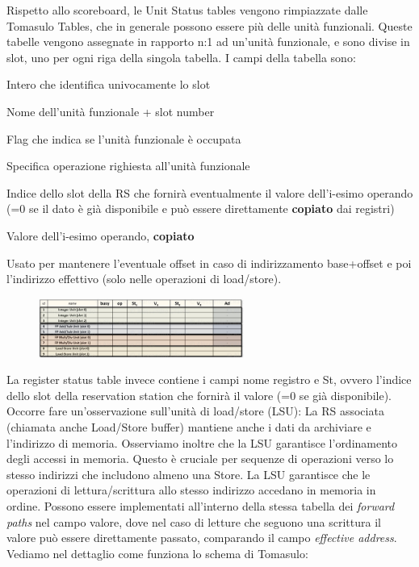 Rispetto allo scoreboard, le Unit Status tables vengono rimpiazzate dalle Tomasulo Tables, che in generale possono essere più delle unità funzionali. Queste tabelle vengono assegnate in rapporto n:1 ad un'unità funzionale, e sono divise in slot, uno per ogni riga della singola tabella. I campi della tabella sono:

\begin{description}[style=nextline,leftmargin=3.45cm,labelwidth=2.8cm,labelsep=0.4cm,font=\ttfamily\bfseries, itemsep=0.01em]
\item[id] Intero che identifica univocamente lo slot
\item[name] Nome dell'unità funzionale + slot number
\item[busy] Flag che indica se l'unità funzionale è occupata
\item[op] Specifica operazione righiesta all'unità funzionale 
\item[$st_1$] Indice dello slot della RS che fornirà eventualmente il valore dell'i-esimo operando (=0 se il dato è già disponibile e può essere direttamente \textbf{copiato} dai registri) 
\item[$V_i$] Valore dell'i-esimo operando, \textbf{copiato} 
\item[$Ad$] Usato per mantenere l'eventuale offset in caso di indirizzamento base+offset e poi l'indirizzo effettivo (solo nelle operazioni di load/store).  
\end{description}


\begin{figure}[ht]
    \centering
    \includegraphics[width=0.6\textwidth]{fig/chapter_2/tomasulo_tables.png}
\end{figure}

\noindent La register status table invece contiene i campi nome registro e St, ovvero l'indice dello slot della reservation station che fornirà il valore (=0 se già disponibile). 
Occorre fare un'osservazione sull'unità di load/store (LSU): La RS associata (chiamata anche Load/Store buffer) mantiene anche i dati da archiviare e l'indirizzo di memoria. Osserviamo inoltre che la LSU garantisce l'ordinamento degli accessi in memoria. Questo è cruciale per sequenze di operazioni verso lo stesso indirizzi che includono almeno una Store. La LSU garantisce che le operazioni di lettura/scrittura allo stesso indirizzo accedano in memoria in ordine. Possono essere implementati all'interno della stessa tabella dei \textit{forward paths} nel campo valore, dove nel caso di letture che seguono una scrittura il valore può essere direttamente passato, comparando il campo \textit{effective address}.
\\ \noindent Vediamo nel dettaglio come funziona lo schema di Tomasulo:

